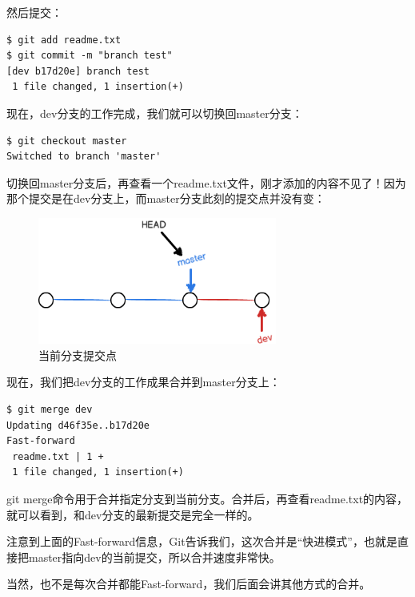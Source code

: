 然后提交：

\begin{verbatim}
$ git add readme.txt 
$ git commit -m "branch test"
[dev b17d20e] branch test
 1 file changed, 1 insertion(+)
\end{verbatim}

现在，dev分支的工作完成，我们就可以切换回master分支：

\begin{verbatim}
$ git checkout master
Switched to branch 'master'
\end{verbatim}

切换回master分支后，再查看一个readme.txt文件，刚才添加的内容不见了！因为那个提交是在dev分支上，而master分支此刻的提交点并没有变：

\begin{figure}[h]
  \centering
  \includegraphics[width=0.7\textwidth]{img/git-br-on-master.png}
  \caption{当前分支提交点}
  \label{fig:git-br-on-master}
\end{figure}


现在，我们把dev分支的工作成果合并到master分支上：

\begin{verbatim}
$ git merge dev
Updating d46f35e..b17d20e
Fast-forward
 readme.txt | 1 +
 1 file changed, 1 insertion(+)
\end{verbatim}

git merge命令用于合并指定分支到当前分支。合并后，再查看readme.txt的内容，就可以看到，和dev分支的最新提交是完全一样的。

注意到上面的Fast-forward信息，Git告诉我们，这次合并是“快进模式”，也就是直接把master指向dev的当前提交，所以合并速度非常快。

当然，也不是每次合并都能Fast-forward，我们后面会讲其他方式的合并。

